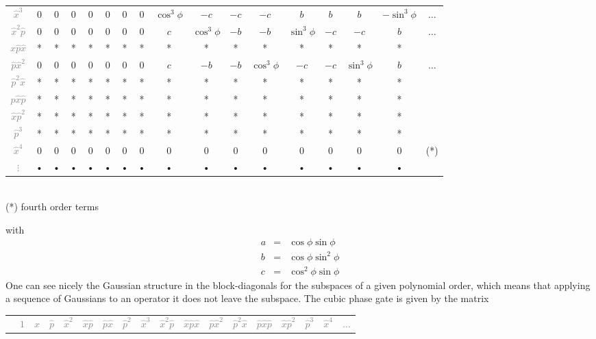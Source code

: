 \documentclass[aps,pra,10pt,onecolumn,notitlepage, groupedaddress,nofootinbib]{revtex4-1}
\theoremstyle{plain}
\begin{document}
{\begin{center}
\begin{tabular}{ccccccccccccccccc}
\textcolor{gray}{$\hat{x}^3$} & 0 & 0 & 0 & 0 & 0 & 0 & 0 & $\cos^3 \phi$ & $- c$ & $- c$ & $ -c$ & $ b$ & $b$ & $b$ & $-\sin^3 \phi$ &  $\hdots$ \\
\textcolor{gray}{$\hat{x}^2\hat{p}$} & 0 & 0 & 0 & 0 & 0 & 0 & 0 & $c$ & $\cos^3 \phi$ & $-b$ & $-b$ & $\sin^3 \phi$ & $-c$  & $-c$ & $b$ &  $\hdots$ \\
\textcolor{gray}{$\hat{x}\hat{p}\hat{x}$} & * & * & * & * & * & * & * & * & * & * & * & * & *  & *& *  \\
\textcolor{gray}{$\hat{p}\hat{x}^2$} & 0 & 0 & 0 & 0 & 0 & 0 & 0 & $c$ & $-b$ & $-b$ & $\cos^3 \phi$ & $-c$ & $-c$  & $\sin^3 \phi$ & $b$ &  $\hdots$ \\
\textcolor{gray}{$\hat{p}^2\hat{x}$} & * & * & * & * & * & * & * & * & * & * & * & * & *  & *& *  \\
\textcolor{gray}{$\hat{p}\hat{x}\hat{p}$} & * & * & * & * & * & * & * & * & * & * & * & * & *  & * & * \\
\textcolor{gray}{$\hat{x}\hat{p}^2$} & * & * & * & * & * & * & * & * & * & * & * & * & *  & *& *  \\
\textcolor{gray}{$\hat{p}^3$} & * & * & * & * & * & * & * & * & * & * & * & * & *  & *& *  \\
\textcolor{gray}{$\hat{x}^4$} & 0 & 0 & 0 & 0 & 0 & 0 & 0 & 0 & 0 & 0 & 0 & 0 & 0& 0 & 0 & (*) \\
\textcolor{gray}{$\vdots$} & • & • & • & • & • & • & • & • & • & • & • & • & • & •& •  \\
\end{tabular}   \\
(*) fourth order terms
\end{center}
with
\begin{eqnarray*}
a &=& \cos \phi \sin \phi \\
b &=& \cos \phi \sin^2 \phi \\
c &=& \cos^2 \phi \sin \phi
\end{eqnarray*}
One can see nicely the Gaussian structure in the block-diagonals for the subspaces of a given polynomial order, which means that applying a sequence of Gaussians to an operator it does not leave the subspace.
The cubic phase gate is given by the matrix
\begin{center}
\def\arraystretch{1.5}
\footnotesize
\begin{tabular}{cccccccccccccccccc}
& \textcolor{gray}{$1$} & \textcolor{gray}{$\hat{x}$} & \textcolor{gray}{$\hat{p}$} & \textcolor{gray}{$\hat{x}^2$} & \textcolor{gray}{$\hat{x}\hat{p}$} & \textcolor{gray}{$\hat{p}\hat{x}$} & \textcolor{gray}{$\hat{p}^2$} & \textcolor{gray}{$\hat{x}^3$} & \textcolor{gray}{$\hat{x}^2\hat{p}$} & \textcolor{gray}{$\hat{x}\hat{p}\hat{x}$} & \textcolor{gray}{$\hat{p}\hat{x}^2$} &  \textcolor{gray}{$\hat{p}^2\hat{x}$} &  \textcolor{gray}{$\hat{p}\hat{x}\hat{p}$} &  \textcolor{gray}{$\hat{x}\hat{p}^2$} &  \textcolor{gray}{$\hat{p}^3$} & \textcolor{gray}{$\hat{x}^4$} & \textcolor{gray}{$\hdots$} \\

\end{tabular}
\end{center}}
\end{document}
